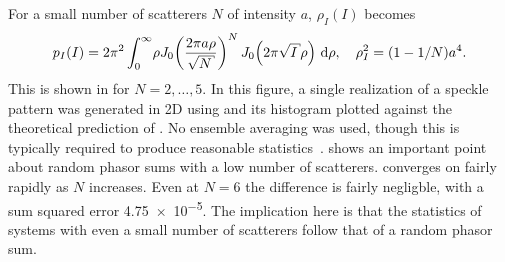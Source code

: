 For a small number of scatterers $N$ of intensity $a$, $\rho_I(I)$
becomes~\cite{goodman2007speckle}
\begin{equation}
p_I(I) = 2\pi^2 \int_0^\infty\! \rho J_0\!\left(\frac{2\pi a
\rho}{\sqrt{N}}\right)^N J_0\!\left(2\pi\sqrt{I}\rho\right)\md\rho,\quad \rho_I^2=(1-1/N)a^4.
\label{eqn:smallscatteqn}
\end{equation}
This is shown in  for
$N=2,\ldots,5$.  In this figure, a single realization of a speckle pattern was generated in 2D
using  and its histogram plotted against the
theoretical prediction of .  No ensemble
averaging was used, though this is typically required to produce reasonable 
statistics~\cite{goodman2007speckle}.
 shows an important point about random phasor sums
with a low number of scatterers.   converges on
 fairly rapidly as $N$ increases.  Even at $N=6$ the
difference is fairly negligble, with a sum squared error \num{4.75e-5}.
The implication here is that the statistics of systems with even a small
number of scatterers follow that of a random phasor sum.
